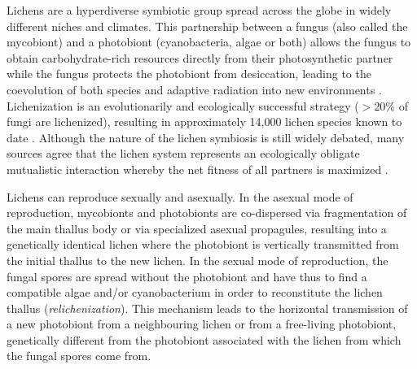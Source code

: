 \documentclass[runningheads,a4paper]{llncs}
\begin{document}
Lichens are a hyperdiverse symbiotic group spread across the globe in widely different niches and climates. This partnership between a fungus (also called the mycobiont) and a photobiont (cyanobacteria, algae or both) allows the fungus to obtain carbohydrate-rich resources directly from their photosynthetic partner \cite{lutzoni2009lichens} while the fungus protects the photobiont from desiccation, leading to the coevolution of both species and adaptive radiation into new environments \cite{nash1996lichen}. Lichenization is an evolutionarily and ecologically successful strategy ($>$20\% of fungi are lichenized), resulting in approximately 14,000 lichen species known to date \cite{lutzoni2009lichens,honegger1998lichen}. Although the nature of the lichen symbiosis is still widely debated, many sources agree that the lichen system represents an ecologically obligate mutualistic interaction whereby the net fitness of all partners is maximized \cite{bronstein1994our,honegger1998lichen}.


Lichens can reproduce sexually and asexually. In the asexual mode of reproduction, mycobionts and photobionts are co-dispersed via fragmentation of the main thallus body or via specialized asexual propagules, resulting into a genetically identical lichen where the photobiont is vertically transmitted from the initial thallus to the new lichen. 
In the sexual mode of reproduction, the fungal spores are spread without the photobiont and have thus to find a compatible algae and/or cyanobacterium in order to reconstitute the lichen thallus (\emph{relichenization}). This mechanism leads to the horizontal transmission of a new photobiont from a neighbouring lichen or from a free-living photobiont, genetically different from the photobiont associated with the lichen from which the fungal spores come from. 
\end{document}
